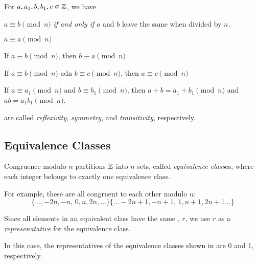 \begin{theorem}
  For $a, a_{1}, b, b_{1}, c\in \operatorname{\mathbb{Z}}$, we have
  \begin{propertylist}
  \item $a \equiv b \pmod{n}$ \emph{if and only if} $a$ and $b$ leave the same  when divided by $n$.
  \item $a \equiv a \pmod{n}$ \label{prop:A_Congruent_B_Reflexivity}
  \item If $a \equiv b \pmod{n}$, then $b \equiv a \pmod{n}$ \label{prop:A_Congruent_B_Symmetry}
  \item If $a \equiv b \pmod{n}$ adn $b \equiv c \pmod{n}$, then $a \equiv c \pmod{n}$ \label{prop:A_Congruent_B_Transitivity}
  \item If $a \equiv a_{1} \pmod{n}$ and $b \equiv b_{1} \pmod{n}$, then $a+b = a_{1} + b_{1} \pmod{n}$ and $ab = a_{1}b_{1} \pmod{n}$.
  \end{propertylist}

   are called \emph{reflexivity}, \emph{symmetry}, and \emph{transitivity}, respectively.
\end{theorem}

\subsection{Equivalence Classes}\label{subsec:Equivalence_Classes}
\begin{definition}\label{def:Equivalence Class}
  Congruence modulo $n$ partitions $\operatorname{\mathbb{Z}}$ into $n$ sets, called \emph{equivalence class}es, where each integer belongs to exactly one equivalence class.

  For example, these are all congruent to each other modulo $n$:
  \begin{subequations}\label{eq:Equivalence_Class}
    \begin{equation}\label{subeq:Equivalence_Class_Remainder_0}
      \lbrace \ldots, -2n, -n,\, 0, n, 2n, \ldots \rbrace
    \end{equation}
    \begin{equation}\label{subeq:Equivalence_Class_Remainder_1}
      \lbrace \ldots -2n + 1, -n+1,\, 1, n+1, 2n+1 \ldots \rbrace
    \end{equation}
  \end{subequations}

  Since all elements in an equivalent class have the same , $r$, we use $r$ as a \emph{represenatative} for the equivalence class.
  \begin{remark}
    In this case, the representatives of the equivalence classes shown in  are 0 and 1, respectively.
  \end{remark}
\end{definition}

